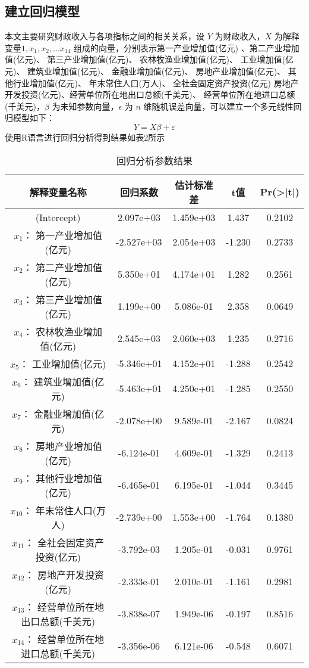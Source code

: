 \documentclass [a4paper]{article}
\begin{document}
\subsection{建立回归模型}

本文主要研究财政收入与各项指标之间的相关关系，设 $Y$ 为财政收入，$X$ 为解释变量$1,x_1,x_2,...x_{14}$ 组成的向量，分别表示第一产业增加值(亿元)	、第二产业增加值(亿元)、	第三产业增加值(亿元)、	农林牧渔业增加值(亿元)、	工业增加值(亿元)、	建筑业增加值(亿元)、	金融业增加值(亿元)、	房地产业增加值(亿元)、	其他行业增加值(亿元)、	年末常住人口(万人)、	全社会固定资产投资(亿元)	房地产开发投资(亿元)、经营单位所在地出口总额(千美元)、	经营单位所在地进口总额(千美元)，$\beta$ 为未知参数向量，$\epsilon$ 为 $n$ 维随机误差向量，可以建立一个多元线性回归模型如下：
$$
Y=X\beta + \varepsilon
$$
使用R语言进行回归分析得到结果如表2所示
\begin{table}
  \centering
  \caption{回归分析参数结果}
  \small %
  \begin{tabular}{ccccc}
    \toprule
      解释变量名称 & 回归系数 & 估计标准差 & t值 & Pr(>|t|)  \\
    \midrule

    (Intercept)   & 2.097e+03 &   1.459e+03 &    1.437  &   0.2102 \\
    $x_1$： 第一产业增加值(亿元)      &      -2.527e+03  &  2.054e+03  &  -1.230  &   0.2733  \\
    $x_2$： 第二产业增加值(亿元)     &       5.350e+01  &  4.174e+01  &   1.282   &  0.2561  \\
    $x_3$： 第三产业增加值(亿元)      &      1.199e+00  &  5.086e-01  &   2.358   &  0.0649 \\
    $x_4$：  农林牧渔业增加值(亿元)       &     2.545e+03  &  2.060e+03  &   1.235  &   0.2716  \\
    $x_5$：  工业增加值(亿元)       &    -5.346e+01  &  4.152e+01  &  -1.288   &  0.2542  \\
    $x_6$： 建筑业增加值(亿元)      &     -5.463e+01  &  4.250e+01  &  -1.285   &  0.2550  \\
    $x_7$：   金融业增加值(亿元)     &     -2.078e+00  &  9.589e-01  &  -2.167  &   0.0824  \\
    $x_8$：   房地产业增加值(亿元)      &    -6.124e-01  &  4.609e-01  &  -1.329   &  0.2413  \\
    $x_9$：  其他行业增加值(亿元)      &    -6.465e-01  &  6.195e-01  &  -1.044   &  0.3445  \\
    $x_{10}$：   年末常住人口(万人)    &     -2.739e+00   & 1.553e+00  &  -1.764  &   0.1380  \\
    $x_{11}$：  全社会固定资产投资(亿元)     &     -3.792e-03  &  1.205e-01  &  -0.031   &  0.9761  \\
    $x_{12}$：  房地产开发投资(亿元)      &    -2.333e-01  &  2.010e-01  &  -1.161   &  0.2981  \\
    $x_{13}$：  经营单位所在地出口总额(千美元)   &    -3.838e-07  &  1.949e-06  &  -0.197   &  0.8516  \\
    $x_{14}$：  	经营单位所在地进口总额(千美元)        &     -3.356e-06   & 6.121e-06  &  -0.548   &  0.6071  \\
    \bottomrule


\end{tabular}
\end{table}
\end{document}
